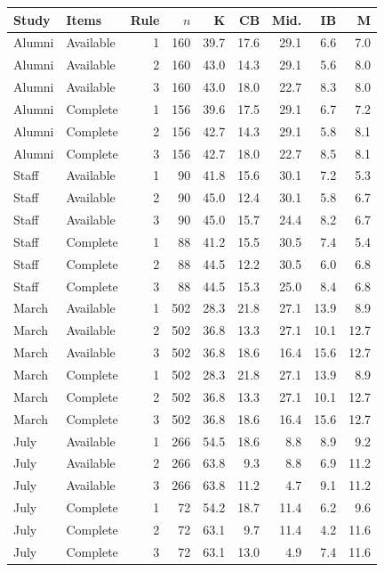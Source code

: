 \begin{tabular}{llrrrrrrr}
\toprule
Study & Items & Rule & $n$ & K & CB & Mid. & IB & M \\
\midrule
Alumni & Available & 1 & 160 & 39.7 & 17.6 & 29.1 & 6.6 & 7.0 \\
Alumni & Available & 2 & 160 & 43.0 & 14.3 & 29.1 & 5.6 & 8.0 \\
Alumni & Available & 3 & 160 & 43.0 & 18.0 & 22.7 & 8.3 & 8.0 \\
Alumni & Complete & 1 & 156 & 39.6 & 17.5 & 29.1 & 6.7 & 7.2 \\
Alumni & Complete & 2 & 156 & 42.7 & 14.3 & 29.1 & 5.8 & 8.1 \\
Alumni & Complete & 3 & 156 & 42.7 & 18.0 & 22.7 & 8.5 & 8.1 \\
Staff & Available & 1 &  90 & 41.8 & 15.6 & 30.1 & 7.2 & 5.3 \\
Staff & Available & 2 &  90 & 45.0 & 12.4 & 30.1 & 5.8 & 6.7 \\
Staff & Available & 3 &  90 & 45.0 & 15.7 & 24.4 & 8.2 & 6.7 \\
Staff & Complete & 1 &  88 & 41.2 & 15.5 & 30.5 & 7.4 & 5.4 \\
Staff & Complete & 2 &  88 & 44.5 & 12.2 & 30.5 & 6.0 & 6.8 \\
Staff & Complete & 3 &  88 & 44.5 & 15.3 & 25.0 & 8.4 & 6.8 \\
March & Available & 1 & 502 & 28.3 & 21.8 & 27.1 & 13.9 & 8.9 \\
March & Available & 2 & 502 & 36.8 & 13.3 & 27.1 & 10.1 & 12.7 \\
March & Available & 3 & 502 & 36.8 & 18.6 & 16.4 & 15.6 & 12.7 \\
March & Complete & 1 & 502 & 28.3 & 21.8 & 27.1 & 13.9 & 8.9 \\
March & Complete & 2 & 502 & 36.8 & 13.3 & 27.1 & 10.1 & 12.7 \\
March & Complete & 3 & 502 & 36.8 & 18.6 & 16.4 & 15.6 & 12.7 \\
July & Available & 1 & 266 & 54.5 & 18.6 & 8.8 & 8.9 & 9.2 \\
July & Available & 2 & 266 & 63.8 & 9.3 & 8.8 & 6.9 & 11.2 \\
July & Available & 3 & 266 & 63.8 & 11.2 & 4.7 & 9.1 & 11.2 \\
July & Complete & 1 &  72 & 54.2 & 18.7 & 11.4 & 6.2 & 9.6 \\
July & Complete & 2 &  72 & 63.1 & 9.7 & 11.4 & 4.2 & 11.6 \\
July & Complete & 3 &  72 & 63.1 & 13.0 & 4.9 & 7.4 & 11.6 \\
\bottomrule
\end{tabular}
